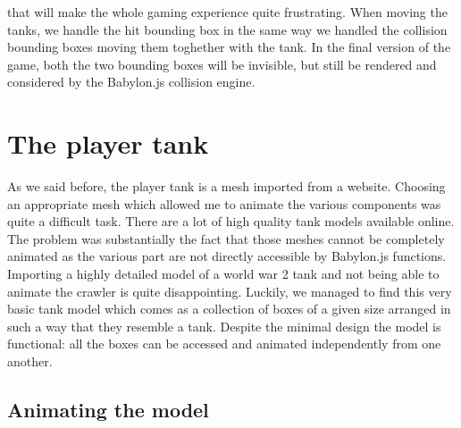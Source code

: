 \documentclass[14pt]{article}
\begin{document}
that will make the whole gaming experience quite frustrating. When moving the tanks, we handle the hit bounding box in the same way we handled the collision bounding boxes moving them toghether with the tank. In the final version of the game, both the two bounding boxes will be invisible, but still be rendered and considered by the Babylon.js collision engine.

\section{The player tank}
As we said before, the player tank is a mesh imported from a website. Choosing an appropriate mesh which allowed me to animate the various components was quite a difficult task. There are a lot of high quality tank models available online. The problem was substantially the fact that those meshes cannot be completely animated as the various part are not directly accessible by Babylon.js functions. Importing a highly detailed model of a world war 2 tank and not being able to animate the crawler is quite disappointing. Luckily, we managed to find this very basic tank model which comes as a collection of boxes of a given size arranged in such a way that they resemble a tank. Despite the minimal design the model is functional: all the boxes can be accessed and animated independently from one another.\\
\subsection{Animating the model}
\end{document}
